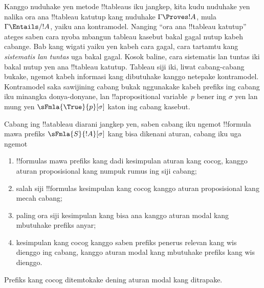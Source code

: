 \documentclass[../../../include/open-logic-section]{subfiles}
\begin{document}


\begin{explain}
  Kanggo nuduhake yen metode !!{tableau}s iku jangkep, kita kudu
  nuduhake yen nalika ora ana !!{tableau} katutup kang nuduhake
  $\Gamma \Proves !A$, mula $\Gamma \Entails/ !A$, yaiku ana
  kontramodel. Nanging ``ora ana !!{tableau} katutup'' ateges saben
  cara nyoba mbangun tableau kasebut bakal gagal nutup kabeh cabange.
  Bab kang wigati yaiku yen kabeh cara gagal, cara tartamtu kang
  \emph{sistematis lan tuntas} uga bakal gagal. Kosok baline, cara
  sistematis lan tuntas iki bakal nutup yen ana !!{tableau} katutup.
  Tableau siji iki, liwat cabang-cabang bukake, ngemot kabeh informasi
  kang dibutuhake kanggo netepake kontramodel. Kontramodel saka
  sawijining cabang bukak nggunakake kabeh prefiks ing cabang iku
  minangka donya-donyane, lan !!a{propositional
    variable}~$p$ bener ing $\sigma$ yen lan mung yen
  $\sFmla{\True}{p}[\sigma]$ katon ing cabang kasebut.
\end{explain}

\begin{defn}
  Cabang ing !!a{tableau} diarani jangkep yen, saben cabang iku ngemot
  !!{formula} mawa prefiks $\sFmla{S}{!A}[\sigma]$ kang bisa dikenani
  aturan, cabang iku uga ngemot
  \begin{enumerate}
    \item !!{formula}s mawa prefiks kang dadi kesimpulan aturan kang
      cocog, kanggo aturan proposisional kang numpuk rumus ing siji
      cabang;
    \item salah siji !!{formula}s kesimpulan kang cocog kanggo aturan
      proposisional kang mecah cabang;
    \item paling ora siji kesimpulan kang bisa ana kanggo aturan modal
      kang mbutuhake prefiks anyar;
    \item kesimpulan kang cocog kanggo saben prefiks penerus relevan
      kang wis dienggo ing cabang, kanggo aturan modal kang mbutuhake
      prefiks kang wis dienggo.
  \end{enumerate}
Prefiks kang cocog ditemtokake dening aturan modal kang ditrapake.
\end{defn}
\end{document}
